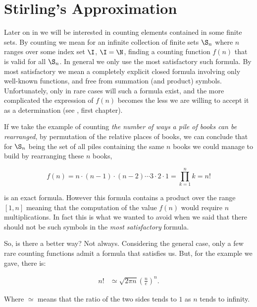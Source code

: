 \section{Stirling's Approximation}
\label{tree:sorting:stirling}

Later on in  we will be interested in counting elements
contained in some
finite sets. By counting we mean for an infinite collection of finite sets
$\S_n$ where $n$ ranges over some index set $\I$, \eg $\I = \N$, finding a
counting function $f(n)$ that is valid for all $\S_n$. In general we only
use the most satisfactory such formula. By most satisfactory we mean a
completely explicit closed formula involving only well-known functions, and
free from summation (and product) symbols. Unfortunately, only in rare cases
will such a formula exist, and the more complicated the expression of $f(n)$
becomes the less we are willing to accept it as a determination
(see \citet*{Stanley:2011:ECV:2124415}, first chapter).

If we take the example of counting \emph{the number of ways a pile of books can
be rearranged}, \ie by permutation of the relative places of books, we can
conclude that for $\S_n$ being the set of all piles containing the same $n$
books we could manage to build by rearranging these $n$ books,

\begin{displaymath}
f(n) = n \cdot (n-1) \cdot (n-2) \cdots 3 \cdot 2 \cdot 1 = \prod_{k=1}^n k = n!
\end{displaymath}

is an exact formula. However this formula contains a product over the range
$[1, n]$ meaning that the computation of the value $f(n)$ would require $n$
multiplications. In fact this is what we wanted to avoid when we said that
there should not be such symbols in the \emph{most satisfactory} formula.

So, is there a better way? Not always. Considering the general case, only a few
rare counting functions admit a formula that satisfies us. But, for
the example we gave, there is:

\begin{theorem}
\label{tree:sorting:theorem/stirling}
\begin{align*}
n! &\simeq \sqrt{2 \pi n} \left(\frac{n}{e}\right)^n.
\end{align*}
\end{theorem}

Where \(\simeq\) means that the ratio of the two sides tends to \(1\) as \(n\)
tends to infinity.

